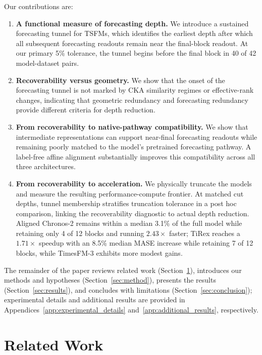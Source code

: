 \documentclass{article} %
\begin{document}
Our contributions are:
\begin{enumerate}[leftmargin=*]

\item \textbf{A functional measure of forecasting depth.} We introduce a  sustained forecasting tunnel for TSFMs, which identifies the earliest depth after which all subsequent forecasting readouts remain near the final-block readout. At our primary 5\% tolerance, the tunnel begins before the final block in 40 of 42 model-dataset pairs.

\item \textbf{Recoverability versus geometry.} We show that the onset of the forecasting tunnel is not marked by CKA similarity regimes or effective-rank changes, indicating that geometric redundancy and forecasting redundancy provide different criteria for depth reduction.

\item \textbf{From recoverability to native-pathway compatibility.} We show that intermediate representations can support near-final forecasting readouts while remaining poorly matched to the model's pretrained forecasting pathway. A label-free affine alignment substantially improves this compatibility across all three architectures.

\item \textbf{From recoverability to acceleration.} We physically truncate the models and measure the resulting performance-compute frontier. At matched cut depths, tunnel membership stratifies truncation tolerance in a post hoc comparison, linking the recoverability diagnostic to actual depth reduction. Aligned Chronos-2 remains within a median 3.1\% of the full model while retaining only 4 of 12 blocks and running $2.43\times$ faster; TiRex reaches a $1.71\times$ speedup with an 8.5\% median MASE increase while retaining 7 of 12 blocks, while TimesFM-3 exhibits more modest gains.

\end{enumerate}

The remainder of the paper reviews related work (Section~\ref{sec:related_work}), introduces our methods and hypotheses (Section~\ref{sec:method}), presents the results (Section~\ref{sec:results}), and concludes with limitations (Section~\ref{sec:conclusion}); experimental details and additional results are provided in Appendices~\ref{app:experimental_details} and~\ref{app:additional_results}, respectively.

\section{Related Work}
\label{sec:related_work}
\end{document}
